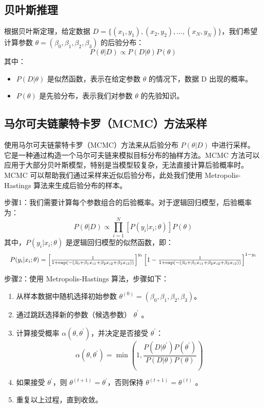 \documentclass[12pt]{article}
\begin{document}
\subsection{贝叶斯推理}
根据贝叶斯定理，给定数据 $D=\{(x_1,y_1),(x_2,y_2),\ldots,(x_N,y_N)\}$，我们希望计算参数 $\theta=(\beta_0,\beta_1,\beta_2,\beta_3)$ 的后验分布：
\begin{equation}
    P(\theta|D)\propto P(D|\theta)P(\theta)
\end{equation}
其中：
\begin{itemize}
	\item $P(D|\theta)$ 是似然函数，表示在给定参数 $\theta$ 的情况下，数据 D 出现的概率。
	\item $P(\theta)$ 是先验分布，表示我们对参数 $\theta$ 的先验知识。
\end{itemize}


\subsection{马尔可夫链蒙特卡罗（MCMC）方法采样}
使用马尔可夫链蒙特卡罗（MCMC）方法来从后验分布 $P(\theta|D)$ 中进行采样。
它是一种通过构造一个马尔可夫链来模拟目标分布的抽样方法。MCMC 方法可以应用于大部分贝叶斯模型，特别是当模型较复杂，无法直接计算后验概率时。MCMC 可以帮助我们通过采样来近似后验分布，此处我们使用 Metropolis-Hastings 算法来生成后验分布的样本。

步骤1：我们需要计算每个参数组合的后验概率。对于逻辑回归模型，后验概率为：
\begin{equation}
    P(\theta|D)\propto\prod_{i=1}^N\left[P(y_i|x_i;\theta)\right]P(\theta)
\end{equation}
其中，$P(y_i|x_i;\theta)$ 是逻辑回归模型的似然函数，即：
\begin{equation}
	\resizebox{\textwidth}{!}{$
	P(y_i|x_i;\theta)=\left[\frac{1}{1+\exp(-(\beta_0+\beta_1x_{i1}+\beta_2x_{i2}+\beta_3x_{i3}))}\right]^{y_i}\left[1-\frac{1}{1+\exp(-(\beta_0+\beta_1x_{i1}+\beta_2x_{i2}+\beta_3x_{i3}))}\right]^{1-y_i}
	$}
\end{equation}

步骤2：使用 Metropolis-Hastings 算法，步骤如下：
\begin{enumerate}
	\item 从样本数据中随机选择初始参数 $\theta^{(0)}=(\beta_0,\beta_1,\beta_2,\beta_3)$。
	\item 通过跳跃选择新的参数（候选参数） $\theta^{\prime}$ 。
	\item 计算接受概率 $\alpha(\theta,\theta^{\prime})$，并决定是否接受 $\theta^{\prime}$：
	\begin{equation}
		\alpha(\theta,\theta^{\prime})=\min\left(1,\frac{P(D|\theta^{\prime})P(\theta^{\prime})}{P(D|\theta)P(\theta)}\right)
	\end{equation}
	\item 如果接受 $\theta^{\prime}$，则 $\theta^{(t+1)}=\theta^{\prime}$，否则保持 $\theta^{(t+1)}=\theta^{(t)}$ 。
	\item 重复以上过程，直到收敛。
\end{enumerate}
\end{document}
